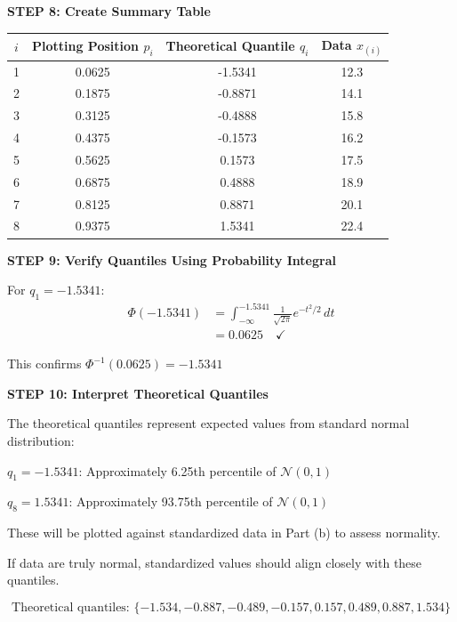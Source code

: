\documentclass[12pt]{article}
\begin{document}
\begin{solution}
\textbf{STEP 8: Create Summary Table}

\begin{center}
\begin{tabular}{cccc}
\hline
$i$ & Plotting Position $p_i$ & Theoretical Quantile $q_i$ & Data $x_{(i)}$ \\
\hline
1 & 0.0625 & -1.5341 & 12.3 \\
2 & 0.1875 & -0.8871 & 14.1 \\
3 & 0.3125 & -0.4888 & 15.8 \\
4 & 0.4375 & -0.1573 & 16.2 \\
5 & 0.5625 & 0.1573 & 17.5 \\
6 & 0.6875 & 0.4888 & 18.9 \\
7 & 0.8125 & 0.8871 & 20.1 \\
8 & 0.9375 & 1.5341 & 22.4 \\
\hline
\end{tabular}
\end{center}

\textbf{STEP 9: Verify Quantiles Using Probability Integral}

For $q_1 = -1.5341$:
\begin{align*}
\Phi(-1.5341) &= \int_{-\infty}^{-1.5341} \frac{1}{\sqrt{2\pi}} e^{-t^2/2} \, dt \\
&= 0.0625 \quad \checkmark
\end{align*}

This confirms $\Phi^{-1}(0.0625) = -1.5341$

\textbf{STEP 10: Interpret Theoretical Quantiles}

The theoretical quantiles represent expected values from standard normal distribution:

$q_1 = -1.5341$: Approximately 6.25th percentile of $\mathcal{N}(0,1)$

$q_8 = 1.5341$: Approximately 93.75th percentile of $\mathcal{N}(0,1)$

These will be plotted against standardized data in Part (b) to assess normality.

If data are truly normal, standardized values should align closely with these quantiles.

\[\boxed{\text{Theoretical quantiles: } \{-1.534, -0.887, -0.489, -0.157, 0.157, 0.489, 0.887, 1.534\}}\]

\end{solution}
\end{document}
